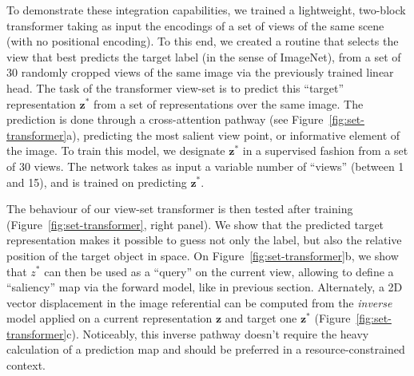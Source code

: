 \documentclass{article}
\begin{document}
To demonstrate these integration capabilities, we trained a lightweight, two-block transformer taking as input the encodings of a set of views of the same scene (with no positional encoding). To this end, we created a routine that selects the view that best predicts the target label (in the sense of ImageNet), from a set of 30 randomly cropped views of the same image via the previously trained linear head. The task of the transformer view-set is to predict this ``target'' representation $\boldsymbol{z}^*$ from a set of representations over the same image.  The prediction is done through a cross-attention pathway (see Figure~\ref{fig:set-transformer}a), predicting the most salient view point, or informative element of the image. To train this model, we designate  $\boldsymbol{z}^*$ in a supervised fashion from a set of 30 views. The network takes as input a variable number of ``views'' (between 1 and 15), and is trained on predicting $\boldsymbol{z}^*$.  


The behaviour of our view-set transformer is then tested after training (Figure~\ref{fig:set-transformer}, right panel). 
We show that the predicted target representation makes it possible to guess not only the label, but also the relative position of the target object in space. %
On Figure~\ref{fig:set-transformer}b, we show that $z^*$ can then be used as a ``query'' on the current view, allowing to define a ``saliency'' map via the forward model, like in previous section. Alternately, a 2D vector displacement in the image referential can be computed from the \emph{inverse} model applied on a current representation $\boldsymbol{z}$ and target one $\boldsymbol{z}^*$ (Figure~\ref{fig:set-transformer}c). Noticeably, this inverse pathway doesn't require the heavy calculation of a prediction map and should be preferred in a resource-constrained context.
\end{document}
